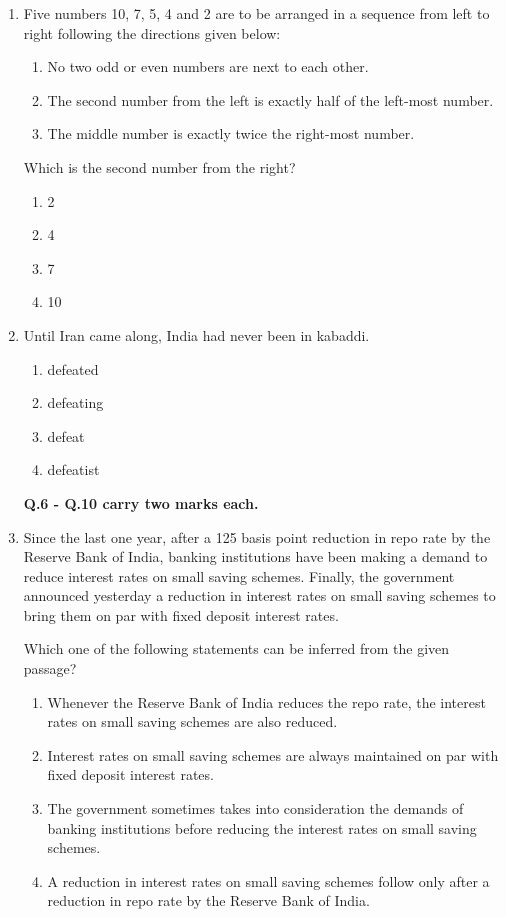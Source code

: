 \documentclass{article}
\begin{document}
\begin{enumerate}[leftmargin=*]
\item Five numbers 10, 7, 5, 4 and 2 are to be arranged in a sequence from left to right following the directions given below:
\begin{enumerate}
\item No two odd or even numbers are next to each other.
\item The second number from the left is exactly half of the left-most number.
\item The middle number is exactly twice the right-most number.
\end{enumerate}
Which is the second number from the right?
\begin{multicols}{4}
\begin{enumerate}
\item 2
\item 4
\item 7
\item 10
\end{enumerate}
\end{multicols}

\item Until Iran came along, India had never been \underline{\hspace{1.5cm}} in kabaddi.
\begin{multicols}{4}
\begin{enumerate}
\item defeated
\item defeating
\item defeat
\item defeatist
\end{enumerate}
\end{multicols}

\textbf{Q.6 - Q.10 carry two marks each.}

\item Since the last one year, after a 125 basis point reduction in repo rate by the Reserve Bank of India, banking institutions have been making a demand to reduce interest rates on small saving schemes. Finally, the government announced yesterday a reduction in interest rates on small saving schemes to bring them on par with fixed deposit interest rates.

Which one of the following statements can be inferred from the given passage?
\begin{enumerate}
\item Whenever the Reserve Bank of India reduces the repo rate, the interest rates on small saving schemes are also reduced.
\item Interest rates on small saving schemes are always maintained on par with fixed deposit interest rates.
\item The government sometimes takes into consideration the demands of banking institutions before reducing the interest rates on small saving schemes.
\item A reduction in interest rates on small saving schemes follow only after a reduction in repo rate by the Reserve Bank of India.
\end{enumerate}


\end{enumerate}
\end{document}
